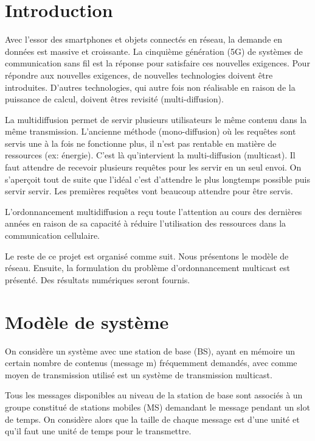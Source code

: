 \documentclass[runningheads]{llncs}
\begin{document}
\section{Introduction}
Avec l’essor des smartphones et objets connectés en réseau, la demande en données 
est massive et croissante. La cinquième génération (5G) de systèmes de 
communication sans fil est la réponse pour satisfaire ces nouvelles exigences.
Pour répondre aux nouvelles exigences, de nouvelles technologies doivent 
être introduites. D’autres technologies, qui autre fois non réalisable en 
raison de la puissance de calcul, doivent êtres revisité (multi-diffusion).

La multidiffusion permet de servir  plusieurs utilisateurs  le même contenu dans 
la même transmission. L'ancienne méthode (mono-diffusion) où les requêtes sont servis 
une à la fois ne fonctionne plus, il n'est pas rentable en matière de 
ressources (ex: énergie). C'est là qu'intervient la multi-diffusion (multicast).
Il faut attendre de recevoir  plusieurs requêtes pour les servir en un seul
envoi. On s'aperçoit tout de suite que l'idéal c'est d'attendre le plus longtemps
possible puis servir servir. Les premières requêtes vont beaucoup attendre pour 
être servis.

L'ordonnancement multidiffusion a reçu toute l'attention au cours des 
dernières années en raison de sa capacité à réduire l'utilisation 
des ressources dans la communication cellulaire.


Le reste de ce projet est organis\'e comme suit. Nous présentons le modèle de réseau.
Ensuite, la formulation du problème d'ordonnancement multicast est pr\'esent\'e.
Des r\'esultats numériques seront fournis.


\section{Modèle de système}
On considère un système avec une station de base (BS), ayant en mémoire 
un certain nombre de contenus (message m) fréquemment demandés, avec comme 
moyen de transmission utilisé est un système de transmission multicast.

Tous les messages disponibles au niveau de la station de base sont associés 
à un groupe constitué de stations mobiles (MS) demandant le message pendant 
un slot de temps.
On considère alors que la taille de chaque message est d'une unité et qu'il 
faut une unité de temps pour le transmettre.
\end{document}
